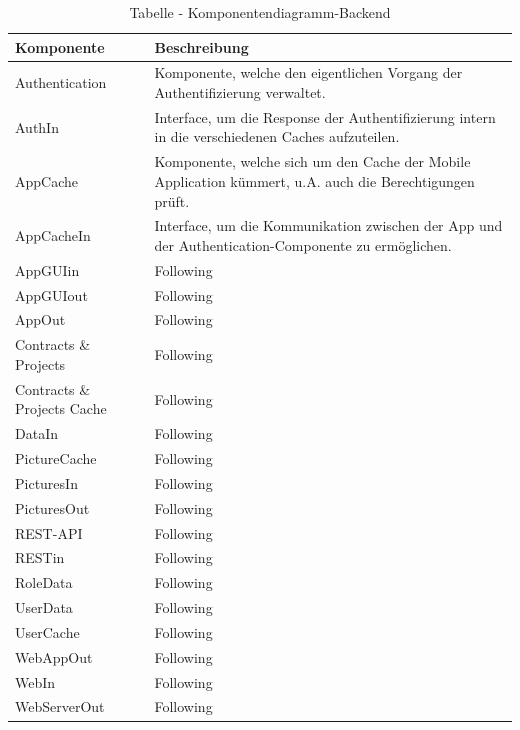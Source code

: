 \begin{longtable}{|p{2.5cm}|p{10.0cm}|}
\caption{Tabelle - Komponentendiagramm-Backend}
\label{tab:table_comp_backend} \\
\hline
\textbf{Komponente} & \textbf{Beschreibung} \\ 
\hline
Authentication & Komponente, welche den eigentlichen Vorgang der Authentifizierung verwaltet. \\
\hline
AuthIn & Interface, um die Response der Authentifizierung intern in die verschiedenen Caches aufzuteilen. \\
\hline
AppCache & Komponente, welche sich um den Cache der Mobile Application kümmert, u.A. auch die Berechtigungen prüft. \\
\hline
AppCacheIn & Interface, um die Kommunikation zwischen der App und der Authentication-Componente zu ermöglichen. \\
\hline
AppGUIin & Following \\
\hline
AppGUIout & Following \\
\hline
AppOut & Following \\
\hline
Contracts {\&} Projects & Following \\
\hline
Contracts {\&} Projects Cache & Following \\
\hline
DataIn & Following \\
\hline
PictureCache & Following \\
\hline
PicturesIn & Following \\
\hline
PicturesOut & Following \\
\hline
REST-API & Following \\
\hline
RESTin & Following \\
\hline
RoleData & Following \\
\hline
UserData & Following \\
\hline
UserCache & Following \\
\hline
WebAppOut & Following \\
\hline
WebIn & Following \\
\hline
WebServerOut & Following \\
\hline
\end{longtable}